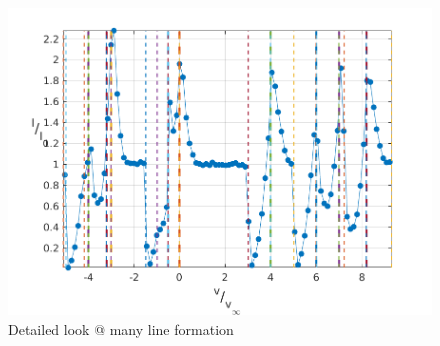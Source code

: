 \documentclass[../main/main.tex]{subfiles}
\begin{document}
\begin{figure}[!htp]
\centering
\includegraphics[width=1\textwidth]{../../two_resonance_lines/figures/multiple_lines_MANY_without_red_box.png}
\caption{Detailed look @ many line formation}
\label{test_superposition_1}
\end{figure}

\newpage
\end{document}
